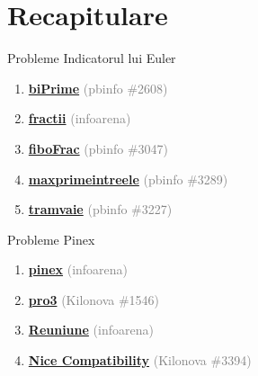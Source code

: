 \documentclass[10pt]{beamer}
\begin{document}
\section{Recapitulare}

\begin{frame}{Probleme \textemdash{} Indicatorul lui Euler}
  \begin{enumerate}\itemsep3pt\normalsize
    \item \href{https://www.pbinfo.ro/probleme/2608/biprime}{\textbf{biPrime}}
          \textcolor{gray}{(pbinfo \#2608)}
    \item \href{https://www.infoarena.ro/problema/fractii}{\textbf{fractii}}
          \textcolor{gray}{(infoarena)}
    \item \href{https://www.pbinfo.ro/probleme/3047/fibofrac}{\textbf{fiboFrac}}
          \textcolor{gray}{(pbinfo \#3047)}
    \item \href{https://www.pbinfo.ro/probleme/3289/maxprimeintreele}{\textbf{maxprimeintreele}}
          \textcolor{gray}{(pbinfo \#3289)}
    \item \href{https://www.pbinfo.ro/probleme/3227/tramvaie}{\textbf{tramvaie}}
          \textcolor{gray}{(pbinfo \#3227)}
  \end{enumerate}
\end{frame}

\begin{frame}{Probleme \textemdash{} Pinex}
  \begin{enumerate}\itemsep3pt\normalsize
    \item \href{https://www.infoarena.ro/problema/pinex}{\textbf{pinex}}
          \textcolor{gray}{(infoarena)}
    \item \href{https://kilonova.ro/problems/1546}{\textbf{pro3}}
          \textcolor{gray}{(Kilonova \#1546)}
    \item \href{https://www.infoarena.ro/problema/reuniune}{\textbf{Reuniune}}
          \textcolor{gray}{(infoarena)}
    \item \href{https://kilonova.ro/problems/3394}{\textbf{Nice Compatibility}}
          \textcolor{gray}{(Kilonova \#3394)}
  \end{enumerate}
\end{frame}
\end{document}
